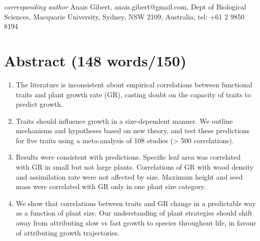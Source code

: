 \documentclass[a4paper]{article}\usepackage[]{graphicx}\usepackage[]{color}
\begin{document}
\textit{corresponding author} Anais Gibert, anais.gibert@gmail.com, Dept of Biological Sciences, Macquarie University, Sydney, NSW 2109, Australia, tel: +61 2 9850 8194








\newpage

\section*{Abstract (148 words/150)}\label{abstract}


\begin{enumerate}

\item
The literature is inconsistent about empirical correlations between functional traits and plant growth rate (GR), casting doubt on the capacity of traits to predict growth.

\item
Traits should influence growth in a size-dependent manner. We outline mechanisms and hypotheses based on new theory, and test these predictions for five traits using a meta-analysis of 108 studies (\textgreater{} 500 correlations).

\item
Results were consistent with predictions. Specific leaf area was correlated with GR in small but not large plants. Correlations of GR with wood density and assimilation rate were not affected by size. Maximum height and seed mass were correlated with GR only in one plant size category.

\item
We show that correlations between traits and GR change in a predictable way as a function of plant size. Our understanding of plant strategies should shift away from attributing slow vs fast growth to species throughout life, in favour of attributing growth trajectories.


\end{enumerate}
\end{document}
